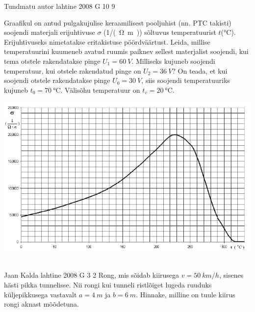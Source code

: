\documentclass[11pt]{article}
\begin{document}
{%
{Tundmatu autor} %
{lahtine} %
{2008} %
{G 10} %
{9} %
{
\ifStatement
Graafikul on antud pulgakujulise keraamilisest pooljuhist (nn. PTC takisti) soojendi materjali erijuhtivuse $\sigma$ (\si{1/(\ohm. m)}) sõltuvus temperatuurist $t$(\si{\celsius}). Erijuhtivuseks nimetatakse eritakistuse pöördväärtust. Leida, millise temperatuurini kuumeneb avatud ruumis paiknev sellest materjalist soojendi, kui tema otstele rakendatakse pinge $U_1 = \SI{60}{V}$. Milliseks kujuneb soojendi temperatuur, kui otstele rakendatud pinge on $U_2 = \SI{36}{V}$? On teada, et kui soojendi otstele rakendatakse pinge $U_0 = \SI{30}{V}$, siis soojendi temperatuuriks kujuneb $t_0= \SI{70}{\celsius}$. Välisõhu temperatuur on $t_v = \SI{20}{\celsius}$.

\begin{center}
	\includegraphics[width=\linewidth]{2008-lahg-10-yl}
\end{center}
\fi
}
\newpage\subsection{\protect{}}

{Jaan Kalda} %
{lahtine} %
{2008} %
{G 3} %
{2} %
{
\ifStatement
Rong, mis sõidab kiirusega $v = \SI{50}{km/h}$, sisenes hästi pikka tunnelisse. Nii rongi kui tunneli ristlõiget lugeda ruuduks küljepikkusega vastavalt $a = \SI{4}{m}$ ja $b = \SI{6}{m}$. Hinnake, milline on tuule kiirus rongi aknast mõõdetuna.
\fi
}

}
\end{document}
